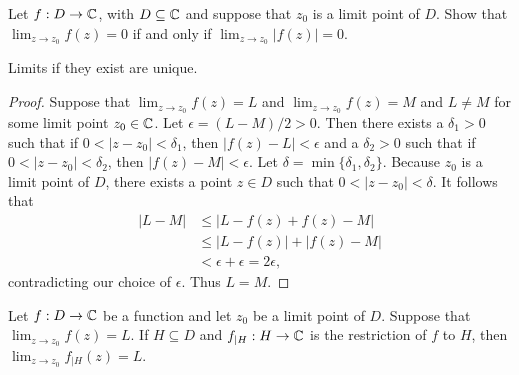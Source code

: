 \begin{example}
    Let \(f : D \to \mathbb{C}\), with \(D \subseteq \mathbb{C}\) and suppose that \(z_0\) is a limit point of \(D\). Show that \(\lim_{z \to z_0} f(z) = 0\) if and only if \(\lim_{z \to z_0} |f(z)| = 0\).
\end{example}

\begin{theorem}%
    Limits if they exist are unique.
    \label{thm:uniqueness-limits}
\end{theorem}

\begin{proof}
    Suppose that \(\lim_{z \to z_0} f(z) = L\) and \(\lim_{z \to z_0} f(z) = M\) and \(L \neq M\) for some limit point \(z_0 \in \mathbb{C}\). Let \(\epsilon = (L - M)/2 > 0\). Then there exists a \(\delta_1 > 0\) such that if \(0 < |z - z_0| < \delta_1\), then \(|f(z) - L| < \epsilon\) and a \(\delta_2 > 0\) such that if \(0 < |z - z_0| < \delta_2\), then \(|f(z) - M| < \epsilon\). Let \(\delta = \min\{\delta_1, \delta_2\}\). Because \(z_0\) is a limit point of \(D\), there exists a point \(z \in D\) such that \(0 < |z - z_0| < \delta\). It follows that
    \begin{align*}
        |L - M| &\leq |L - f(z) + f(z) - M| \\
        &\leq |L - f(z)| + |f(z) - M| \\
        &< \epsilon + \epsilon = 2\epsilon,
    \end{align*}
    contradicting our choice of \(\epsilon\). Thus \(L = M\).
\end{proof}

\begin{theorem}%
    Let \(f : D \to \mathbb{C}\) be a function and let \(z_0\) be a limit point of \(D\). Suppose that \(\lim_{z \to z_0} f(z) = L\). If \(H \subseteq D\) and \(f_{|H} : H \to \mathbb{C}\) is the restriction of \(f\) to \(H\), then \(\lim_{z \to z_0} f_{|H}(z) = L\).
    \label{thm:limit-restriction}
\end{theorem}

